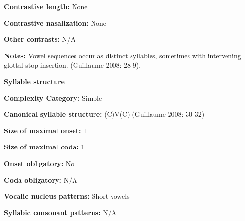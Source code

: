 \begin{styleBody}
\textbf{Contrastive length:} None
\end{styleBody}

\begin{styleBody}
\textbf{Contrastive nasalization:} None
\end{styleBody}

\begin{styleBody}
\textbf{Other contrasts:} N/A
\end{styleBody}

\begin{styleBody}
\textbf{Notes:} Vowel sequences occur as distinct syllables, sometimes with intervening glottal stop insertion. (Guillaume 2008: 28-9).
\end{styleBody}

\begin{styleBody}
\textbf{Syllable structure}
\end{styleBody}

\begin{styleBody}
\textbf{Complexity Category:} Simple
\end{styleBody}

\begin{styleBody}
\textbf{Canonical syllable structure:} (C)V(C)\textbf{ }(Guillaume 2008: 30-32)
\end{styleBody}

\begin{styleBody}
\textbf{Size of maximal onset:} 1
\end{styleBody}

\begin{styleBody}
\textbf{Size of maximal coda: }1
\end{styleBody}

\begin{styleBody}
\textbf{Onset obligatory:} No
\end{styleBody}

\begin{styleBody}
\textbf{Coda obligatory:} N/A
\end{styleBody}

\begin{styleBody}
\textbf{Vocalic nucleus patterns: }Short vowels
\end{styleBody}

\begin{styleBody}
\textbf{Syllabic consonant patterns:} N/A
\end{styleBody}

